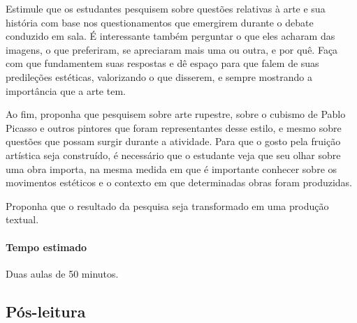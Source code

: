 \documentclass{extrarticle}
\begin{document}
  Estimule que os estudantes pesquisem sobre questões relativas à arte e
  sua história com base nos questionamentos que emergirem durante o
  debate conduzido em sala. É interessante também perguntar o que eles
  acharam das imagens, o que preferiram, se apreciaram mais uma ou
  outra, e por quê. Faça com que fundamentem suas respostas e dê espaço
  para que falem de suas predileções estéticas, valorizando o que
  disserem, e sempre mostrando a importância que a arte tem.

  Ao fim, proponha que pesquisem sobre arte rupestre, sobre o cubismo de
  Pablo Picasso e outros pintores que foram representantes desse estilo,
  e mesmo sobre questões que possam surgir durante a atividade. Para que
  o gosto pela fruição artística seja construído, é necessário que o
  estudante veja que seu olhar sobre uma obra importa, na mesma medida
  em que é importante conhecer sobre os movimentos estéticos e o
  contexto em que determinadas obras foram produzidas.

  Proponha que o resultado da pesquisa seja transformado em uma produção
  textual.

\paragraph{Tempo estimado} Duas aulas de 50 minutos.

\subsection{Pós-leitura}
\end{document}
